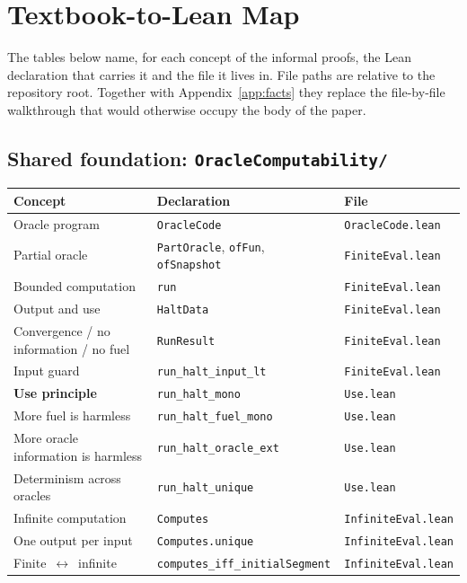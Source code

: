 \section{Textbook-to-Lean Map}
\label{app:map}

The tables below name, for each concept of the informal proofs, the Lean
declaration that carries it and the file it lives in.  File paths are
relative to the repository root.  Together with
Appendix~\ref{app:facts} they replace the file-by-file walkthrough that
would otherwise occupy the body of the paper.

\subsection{Shared foundation: \texttt{OracleComputability/}}

\begin{table}[h]
\centering
\small
\begin{tabular}{lll}
\toprule
Concept & Declaration & File \\
\midrule
Oracle program & \texttt{OracleCode} & \texttt{OracleCode.lean} \\
Partial oracle & \texttt{PartOracle}, \texttt{ofFun}, \texttt{ofSnapshot} & \texttt{FiniteEval.lean} \\
Bounded computation & \texttt{run} & \texttt{FiniteEval.lean} \\
Output and use & \texttt{HaltData} & \texttt{FiniteEval.lean} \\
Convergence / no information / no fuel & \texttt{RunResult} & \texttt{FiniteEval.lean} \\
Input guard & \texttt{run\_halt\_input\_lt} & \texttt{FiniteEval.lean} \\
\textbf{Use principle} & \texttt{run\_halt\_mono} & \texttt{Use.lean} \\
More fuel is harmless & \texttt{run\_halt\_fuel\_mono} & \texttt{Use.lean} \\
More oracle information is harmless & \texttt{run\_halt\_oracle\_ext} & \texttt{Use.lean} \\
Determinism across oracles & \texttt{run\_halt\_unique} & \texttt{Use.lean} \\
Infinite computation & \texttt{Computes} & \texttt{InfiniteEval.lean} \\
One output per input & \texttt{Computes.unique} & \texttt{InfiniteEval.lean} \\
Finite~$\leftrightarrow$~infinite & \texttt{computes\_iff\_initialSegment} & \texttt{InfiniteEval.lean} \\

\end{tabular}
\end{table}
